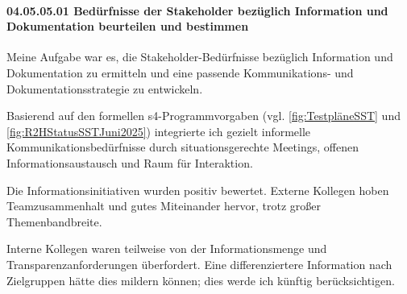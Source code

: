 \paragraph*{04.05.05.01 Bedürfnisse der Stakeholder bezüglich Information und Dokumentation beurteilen
und bestimmen}
\label{para:04.05.05.01_BedürfnisseBezüglichInformationUndDokumentation}

\par Meine Aufgabe war es, die Stakeholder-Bedürfnisse bezüglich Information und Dokumentation zu ermitteln und eine passende Kommunikations- und Dokumentationsstrategie zu entwickeln.

\par Basierend auf den formellen \gls{s4}-Programmvorgaben (vgl. \autoref{fig:TestpläneSST} und \autoref{fig:R2HStatusSSTJuni2025}) integrierte ich gezielt informelle Kommunikationsbedürfnisse durch situationsgerechte Meetings, offenen Informationsaustausch und Raum für Interaktion.

\par Die Informationsinitiativen wurden positiv bewertet. Externe Kollegen hoben Teamzusammenhalt und gutes Miteinander hervor, trotz großer Themenbandbreite.

\par Interne Kollegen waren teilweise von der Informationsmenge und Transparenzanforderungen überfordert. Eine differenziertere Information nach Zielgruppen hätte dies mildern können; dies werde ich künftig berücksichtigen. 
